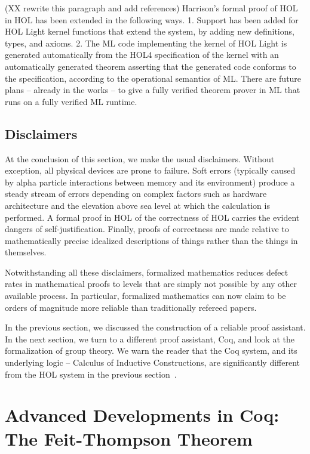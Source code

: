 \documentclass[brochure,english,12pt]{bourbaki}
\theoremstyle{plain}
\begin{document}
(XX rewrite this paragraph and add references)
Harrison's formal proof of HOL in HOL has been extended in the following ways.  1.  Support has been added for 
HOL Light kernel functions that extend the system, by adding new definitions, types, and axioms.
2.  The ML code implementing the kernel of HOL Light is generated automatically from the HOL4 specification of the kernel with
an automatically generated theorem asserting that the generated code conforms to the specification, according to the operational
semantics of ML.
There are future plans -- already in the works --
to give a fully verified theorem prover in ML that runs on a fully verified ML runtime.



\bigskip


\subsection{Disclaimers}

At the conclusion of this section, we make the usual disclaimers.
Without exception, all physical devices are prone to failure.  Soft errors (typically 
caused by alpha particle interactions between memory and its environment) 
produce a steady
stream of errors depending on complex factors such as hardware architecture and
the elevation above sea level at which the
calculation is performed.  A formal proof in HOL of the correctness of HOL carries
the evident dangers of self-justification.  Finally, proofs of correctness are made relative to 
mathematically precise idealized descriptions of things rather than the things
in themselves.

Notwithstanding all these disclaimers,  formalized mathematics reduces defect rates
in mathematical proofs to levels that are simply not possible by any other available process.
In particular, formalized mathematics can now claim to be orders of magnitude more reliable than 
traditionally refereed papers.  


In the previous section, we discussed the construction of a reliable proof assistant.  In the next section,
we turn to a different proof assistant, Coq, and look at the formalization of group theory.
We warn the reader that the Coq system, and its underlying logic -- Calculus of Inductive Constructions, 
are significantly different from the HOL system in the previous section~\cite{CiC}.


\section{Advanced Developments in Coq: The Feit-Thompson Theorem}
\end{document}
